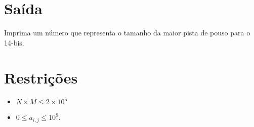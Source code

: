 %
%

\section*{Saída}

Imprima um número que representa o tamanho da maior pista de pouso para o 14-bis.

\section*{Restrições}

\begin{itemize}
  \item $N \times M \leq 2\times 10^5$
  \item $0 \leq a_{i, j} \leq 10^9$.
\end{itemize}


\exemplo
